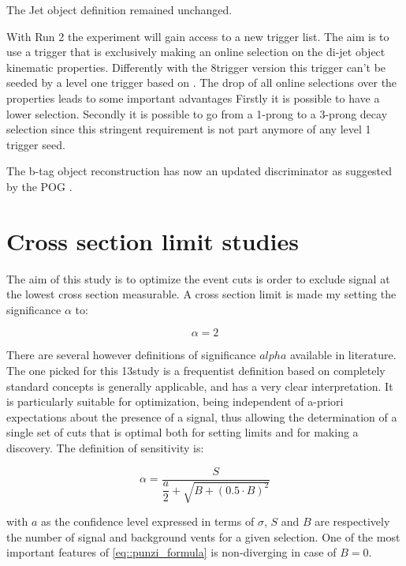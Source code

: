 The Jet object definition remained unchanged.  

With Run 2 the experiment will gain access to a new trigger list. The aim is to use a trigger that is exclusively making an online selection on the di-jet object kinematic properties. Differently with the 8\tev trigger version this trigger can't be seeded by a level one trigger based on \met. The drop of all online selections over the \hadtau properties leads to some important advantages Firstly it is possible to have a lower \hadtau \pt selection. Secondly it is possible to go from a 1-prong to a 3-prong decay selection since this stringent requirement is not part anymore of any level 1 trigger seed. 

The b-tag object reconstruction has now an updated discriminator as suggested by the POG \cite{bib:BJetID_13tev}.

\section{Cross section limit studies}

The aim of this study is to optimize the event cuts is order to exclude signal at the lowest cross section measurable. A cross section limit is made my setting the significance $\alpha$ to:

\begin{equation}
\alpha = 2
\label{eq::significance_xsec_limit}
\end{equation}

There are several however definitions of significance $alpha$ available in literature. The one picked for this 13\tev study is a frequentist definition based on completely standard concepts\cite{Punzi:2003bu} is generally applicable, and has a very clear interpretation. It is particularly suitable for optimization, being independent of a-priori expectations about the presence of a signal, thus allowing the determination of a single set of cuts that is optimal both for setting limits and for making a discovery. The definition of sensitivity is:

\begin{equation}
\alpha = \dfrac{S}{\dfrac{a}{2} + \sqrt{B + (0.5 \cdot B)^{2}}}
\label{eq::punzi_formula}
\end{equation}

with $a$ as the confidence level expressed in terms of $\sigma$, $S$ and $B$ are respectively the number of signal and background vents for a given selection. One of the most important features of \autoref{eq::punzi_formula} is non-diverging in case of $B = 0$.

